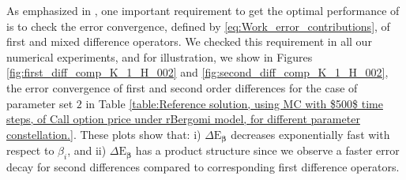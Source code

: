 \begin{remark}
As emphasized in \cite{haji2016multi}, one important requirement to get the optimal performance of  is to check  the error convergence, defined by \eqref{eq:Work_error_contributions},  of first and mixed difference operators. We checked this requirement in all our numerical experiments, and for illustration, we show in Figures  \ref{fig:first_diff_comp_K_1_H_002} and \ref{fig:second_diff_comp_K_1_H_002}, the error convergence of first and second order differences for the case of parameter set $2$ in Table \ref{table:Reference solution, using MC with $500$ time steps, of Call option price under rBergomi model, for different parameter constellation.}.  These plots show that: i) $\Delta \text{E}_{\boldsymbol{\beta}}$ decreases exponentially fast with respect to $\beta_i$, and ii) $\Delta \text{E}_{\boldsymbol{\beta}}$ has a  product structure since  we  observe  a faster error decay for second differences compared to corresponding first difference operators.
\end{remark} 

